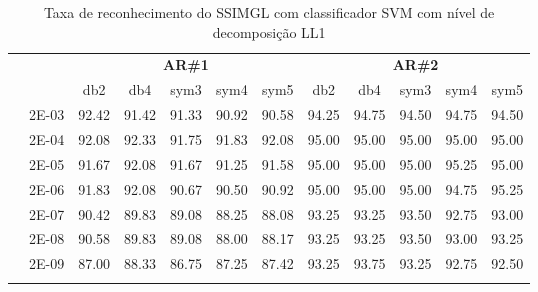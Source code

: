 \begin{table}[H]
\begin{tabular}{|c|c|c c c c c|c c c c c|}
\\\midrule
\end{tabular}

\end{table}


\begin{table}[H]
	\centering
    \normalsize
	\caption{Taxa de reconhecimento do SSIMGL com classificador SVM com nível de decomposição LL1}
	\begin{tabular}{|c|c|c c c c c|c c c c c|}
\cline{3-12}
\multicolumn{2}{c|}{\multirow{2}{*}{}} & \multicolumn{5}{c|}{\textbf{AR\#1}}  & \multicolumn{5}{c|}{\textbf{AR\#2}} \\\cline{3-12}

\multicolumn{2}{c|}{}  & db2 & db4 & sym3 & sym4 & sym5 & db2 & db4& sym3 & sym4 & sym5 \\\hline
\multicolumn{1}{|c|}{ \multirow{6}{*}{\rotatebox[origin=c]{90}{\textbf{Gamma}}} }
&2E-03&	92.42&	91.42&	91.33&	90.92&	90.58&	94.25&	94.75&	94.50&	94.75&	94.50	\\\cline{2-12}
&2E-04&	92.08&	92.33&	91.75&	91.83&	92.08&	95.00&	95.00&	95.00&	95.00&	95.00	\\\cline{2-12}
&2E-05&	91.67&	92.08&	91.67&	91.25&	91.58&	95.00&	95.00&	95.00&	95.25&	95.00	\\\cline{2-12}
&2E-06&	91.83&	92.08&	90.67&	90.50&	90.92&	95.00&	95.00&	95.00&	94.75&	95.25	\\\cline{2-12}
&2E-07&	90.42&	89.83&	89.08&	88.25&	88.08&	93.25&	93.25&	93.50&	92.75&	93.00	\\\cline{2-12}
&2E-08&	90.58&	89.83&	89.08&	88.00&	88.17&	93.25&	93.25&	93.50&	93.00&	93.25	\\\cline{2-12}
&2E-09&	87.00&	88.33&	86.75&	87.25&	87.42&	93.25&	93.75&	93.25&	92.75&	92.50	





	
\\ \midrule
\multicolumn{12}{c}{}\\ 


\end{tabular}
\end{table}
